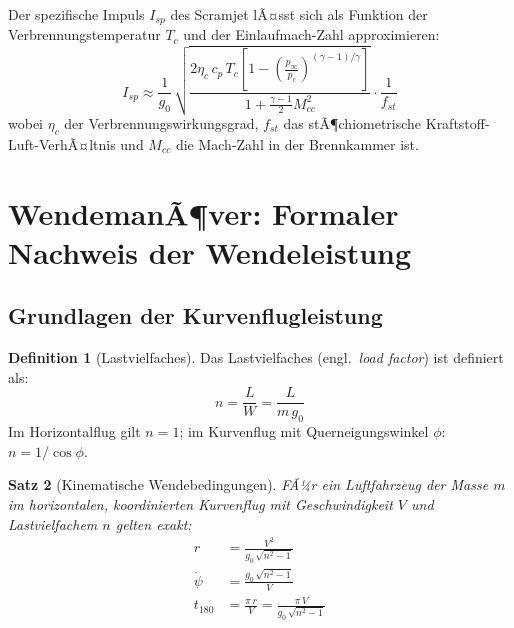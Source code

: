 ﻿\documentclass[12pt,a4paper]{article}
\theoremstyle{plain}
\newtheorem{theorem}{Satz}[section]
\theoremstyle{definition}
\newtheorem{definition}[theorem]{Definition}
\theoremstyle{remark}
\begin{document}
Der spezifische Impuls $I_{sp}$ des Scramjet lÃ¤sst sich als Funktion der
Verbrennungstemperatur $T_c$ und der Einlaufmach-Zahl approximieren:
\begin{equation}
  I_{sp} \approx \frac{1}{g_0}\,\sqrt{\frac{2\eta_c\,c_p\,T_c\left[1 -
    \left(\frac{p_\infty}{p_c}\right)^{(\gamma-1)/\gamma}\right]}
    {1 + \tfrac{\gamma-1}{2}M_{cc}^2}} \cdot \frac{1}{f_{st}}
  \label{eq:isp_scramjet}
\end{equation}
wobei $\eta_c$ der Verbrennungswirkungsgrad, $f_{st}$ das stÃ¶chiometrische
Kraftstoff-Luft-VerhÃ¤ltnis und $M_{cc}$ die Mach-Zahl in der Brennkammer ist.

\section{WendemanÃ¶ver: Formaler Nachweis der Wendeleistung}
\label{sec:wende}

\subsection{Grundlagen der Kurvenflugleistung}

\begin{definition}[Lastvielfaches]
  Das Lastvielfaches (engl.\ \emph{load factor}) ist definiert als:
  \begin{equation}
    n = \frac{L}{W} = \frac{L}{m\,g_0}
    \label{eq:n}
  \end{equation}
  Im Horizontalflug gilt $n = 1$; im Kurvenflug mit Querneigungswinkel $\phi$:
  $n = 1/\cos\phi$.
\end{definition}

\begin{theorem}[Kinematische Wendebedingungen]
  \label{thm:wende}
  FÃ¼r ein Luftfahrzeug der Masse $m$ im horizontalen, koordinierten Kurvenflug
  mit Geschwindigkeit $V$ und Lastvielfachem $n$ gelten exakt:
  \begin{align}
    r &= \frac{V^2}{g_0\,\sqrt{n^2 - 1}}
    \label{eq:radius} \\[4pt]
    \dot{\psi} &= \frac{g_0\,\sqrt{n^2 - 1}}{V}
    \label{eq:psidot} \\[4pt]
    t_{180} &= \frac{\pi\,r}{V} = \frac{\pi\,V}{g_0\,\sqrt{n^2 - 1}}
    \label{eq:t180}
  \end{align}
\end{theorem}
\end{document}
